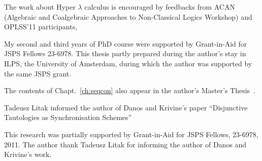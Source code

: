 \begin{acknowledge}
The work about Hyper $\lambda$ calculus is encouraged by feedbacks from
ACAN (Algebraic and
Coalgebraic
Approaches to
Non-Classical Logics Workshop) and OPLSS'11 participants,

My second and third years of PhD course were
supported by Grant-in-Aid for JSPS Fellows 23-6978.
This thesis partly prepared during the author's stay in
ILPS, the University of Amsterdam, during which the author was supported
 by the same JSPS grant.

 The contents of Chapt.~\ref{ch:seqcon} also appear in the author's
 Master's Thesis~\citep{hiraimaster}.

 Tadeusz Litak informed the author of Danos and Krivine's paper
 ``Disjunctive Tautologies as Synchronisation Schemes''

This research was partially supported by
Grant-in-Aid for JSPS Fellows, 23-6978, 2011.
The author thank Tadeusz Litak for informing the author of
Danos and Krivine's work.
\end{acknowledge}
